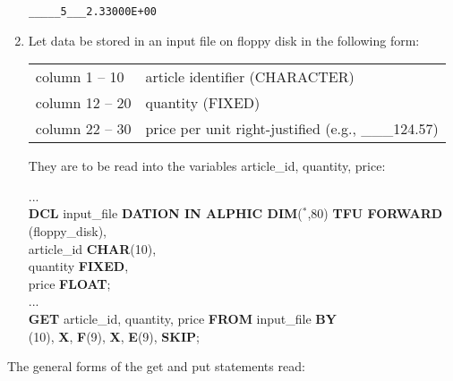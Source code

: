 \begin{enumerate}
\begin{verbatim}
_____5___2.33000E+00
\end{verbatim}
\item Let data be stored in an input file on floppy disk in the
following form:

\begin{tabular}{l@{:}l}
column  1 -- 10 & article identifier (CHARACTER)\\
column 12 -- 20 & quantity (FIXED)\\
column 22 -- 30 & price per unit right-justified (e.g., \_\_\_124.57)
\end{tabular}

They are to be read into the variables article\_id, quantity, price:

...\\
{\bf DCL} input\_file {\bf DATION IN ALPHIC DIM}($^*$,80) {\bf TFU FORWARD}\\
\x {} (floppy\_disk),\\
\x article\_id {\bf CHAR}(10),\\
\x quantity {\bf FIXED},\\
\x price {\bf FLOAT};\\
...\\
{\bf GET} article\_id, quantity, price {\bf FROM} input\_file {\bf BY}\\
(10), {\bf X}, {\bf F}(9), {\bf X}, {\bf E}(9), {\bf SKIP};
\end{enumerate}

The general forms of the get and put statements read:

